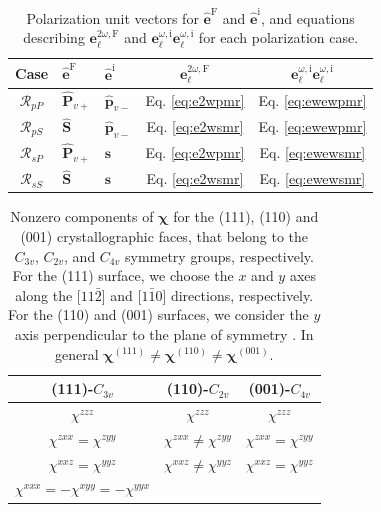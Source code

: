 \begin{table}[t]
\caption[Polarization unit vectors and equations needed for 
$\mathcal{R}_{\mathrm{iF}}$]
{Polarization unit vectors for $\hat{\mathbf{e}}^{\mathrm{F}}$ and
$\hat{\mathbf{e}}^{\mathrm{i}}$, and equations describing
$\mathbf{e}^{2\omega,\mathrm{F}}_{\ell}$ and
$\mathbf{e}^{\omega,\mathrm{i}}_{\ell}\mathbf{e}^{\omega,\mathrm{i}}_{\ell}$ for
each polarization case.}
\label{tab:summary}
\centering
\begin{tabular}{| c | l | l | c | c |}
\hline
Case               & $\hat{\mathbf{e}}^{\mathrm{F}}$
                   & $\hat{\mathbf{e}}^{\mathrm{i}}$
                   & $\mathbf{e}^{2\omega,\mathrm{F}}_{\ell}$
                   & $\mathbf{e}^{\omega,\mathrm{i}}_{\ell}
                      \mathbf{e}^{\omega,\mathrm{i}}_{\ell}$ \\
\hline
$\mathcal{R}_{pP}$ & $\hat{\mathbf{P}}_{v+}$
                   & $\hat{\mathbf{p}}_{v-}$
                   &  Eq. \eqref{eq:e2wpmr} & Eq. \eqref{eq:ewewpmr} \\
$\mathcal{R}_{pS}$ & $\hat{\mathbf{S}}$
                   & $\hat{\mathbf{p}}_{v-}$
                   &  Eq. \eqref{eq:e2wsmr} & Eq. \eqref{eq:ewewpmr} \\
$\mathcal{R}_{sP}$ & $\hat{\mathbf{P}}_{v+}$
                   & $\hat{\mathbf{s}}$
                   &  Eq. \eqref{eq:e2wpmr} & Eq. \eqref{eq:ewewsmr} \\
$\mathcal{R}_{sS}$ & $\hat{\mathbf{S}}$
                   & $\hat{\mathbf{s}}$
                   &  Eq. \eqref{eq:e2wsmr} & Eq. \eqref{eq:ewewsmr} \\
\hline
\end{tabular}
\end{table}
\begin{table}[t]
\caption[Nonzero components of $\boldsymbol{\chi}$ for different surface
symmetries.]
{Nonzero components of $\boldsymbol{\chi}$ for the (111), (110) and (001)
crystallographic faces, that belong to the $C_{3v}$, $C_{2v}$, and $C_{4v}$
symmetry groups, respectively. For the (111) surface, we choose the $x$ and $y$
axes along the [$11\bar{2}$] and [$1\bar{1}0$] directions, respectively. For the
(110) and (001) surfaces, we consider the $y$ axis perpendicular to the plane of
symmetry \cite{sipePRB87}. In general $\boldsymbol{\chi}^{(111)}\ne
\boldsymbol{\chi}^{(110)} \ne \boldsymbol{\chi}^{(001)}$.}
\label{tab:chis}
\centering
\begin{tabular}{| c | c | c |}
\hline 
(111)-$C_{3v}$     & (110)-$C_{2v}$  & (001)-$C_{4v}$ \\
\hline 
$\chi^{zzz}$ & $\chi^{zzz}$ & $\chi^{zzz}$\\
$\chi^{zxx}=\chi^{zyy}$ & $\chi^{zxx}\ne\chi^{zyy}$ & $\chi^{zxx}=\chi^{zyy}$\\
$\chi^{xxz}=\chi^{yyz}$ & $\chi^{xxz}\ne\chi^{yyz}$ & $\chi^{xxz}=\chi^{yyz}$\\
$\chi^{xxx}=-\chi^{xyy}=-\chi^{yyx}$ & &  \\
\hline 
\end{tabular}
\end{table}


